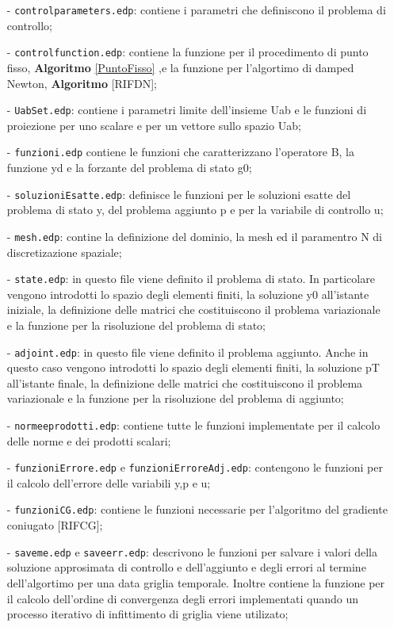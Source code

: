\begin{itemize}
\item[-] \texttt{controlparameters.edp}: contiene i parametri che definiscono il problema di controllo;
\item[-] \texttt{controlfunction.edp}: contiene la funzione per il procedimento di punto fisso, \textbf{Algoritmo} \ref{PuntoFisso} ,e la funzione per l'algortimo di damped Newton, \textbf{Algoritmo} [RIFDN];
\item[-] \texttt{UabSet.edp}: contiene i parametri limite dell'insieme Uab e le funzioni di proiezione per uno scalare e per un vettore sullo spazio Uab;
\item[-] \texttt{funzioni.edp} contiene le funzioni che caratterizzano l'operatore B, la funzione yd e la forzante del problema di stato g0;
\item[-] \texttt{soluzioniEsatte.edp}: definisce le funzioni per le soluzioni esatte del problema di stato y, del problema aggiunto p e per la variabile di controllo u;
\item[-] \texttt{mesh.edp}: contine la definizione del dominio, la mesh ed il paramentro N di discretizazione spaziale;
\item[-] \texttt{state.edp}: in questo file viene definito il problema di stato. In particolare vengono introdotti lo spazio degli elementi finiti, la soluzione y0 all'istante iniziale, la definizione delle matrici che costituiscono il problema variazionale e la funzione per la risoluzione del problema di stato;
\item[-] \texttt{adjoint.edp}: in questo file viene definito il problema aggiunto. Anche in questo caso vengono introdotti lo spazio degli elementi finiti, la soluzione pT all'istante finale, la definizione delle matrici che costituiscono il problema variazionale e la funzione per la risoluzione del problema di aggiunto; 
\item[-] \texttt{normeeprodotti.edp}: contiene tutte le funzioni implementate per il calcolo delle norme e dei prodotti scalari; 
\item[-] \texttt{funzioniErrore.edp} e \texttt{funzioniErroreAdj.edp}: contengono le funzioni per il calcolo dell'errore delle variabili y,p e u;
\item[-] \texttt{funzioniCG.edp}: contiene le funzioni necessarie per l'algoritmo del gradiente coniugato [RIFCG]; 
\item[-] \texttt{saveme.edp} e \texttt{saveerr.edp}: descrivono le funzioni per salvare i valori della soluzione approsimata di controllo e dell'aggiunto e degli errori al termine dell'algortimo per una data griglia temporale. Inoltre contiene la funzione per il calcolo dell'ordine di convergenza degli errori implementati quando un processo iterativo di infittimento di griglia viene utilizato;
\end{itemize}
